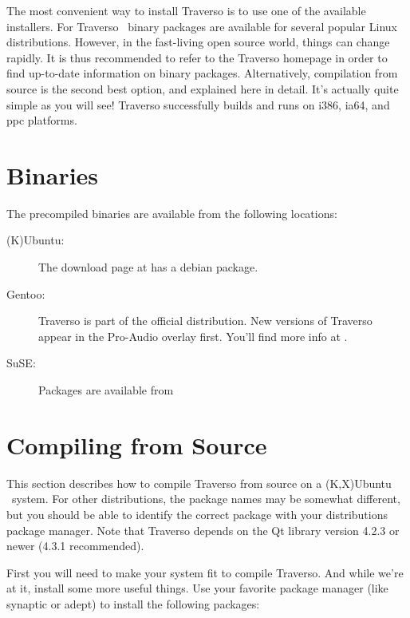 The most convenient way to install Traverso is to use one of the available installers. For Traverso \Version\ binary packages are available for several popular Linux distributions. However, in the fast-living open source world, things can change rapidly. It is thus recommended to refer to the Traverso homepage \cite{trav-hp} in order to find up-to-date information on binary packages. Alternatively, compilation from source is the second best option, and explained here in detail. It's actually quite simple as you will see! Traverso successfully builds and runs on i386, ia64, and ppc platforms.

\section{Binaries}
The precompiled binaries are available from the following locations:

\begin{description}
	\item [(K)Ubuntu:] The download page at \cite{trav-hp} has a debian package.
	\item [Gentoo:] Traverso is part of the official distribution. New versions of Traverso appear in the Pro-Audio overlay first. You'll find more info at \cite{pro-audio-wiki}.
	\item [SuSE:] Packages are available from \cite{suse-ref}
\end{description}

\section{Compiling from Source}
This section describes how to compile Traverso from source on a (K,X)Ubuntu \Ubuntu\ system. For other distributions, the package names may be somewhat different, but you should be able to identify the correct package with your distributions package manager. Note that Traverso depends on the Qt library version 4.2.3 or newer (4.3.1 recommended).

First you will need to make your system fit to compile Traverso. And while we're at it, install some more useful things. Use your favorite package manager (like synaptic or adept) to install the following packages:

